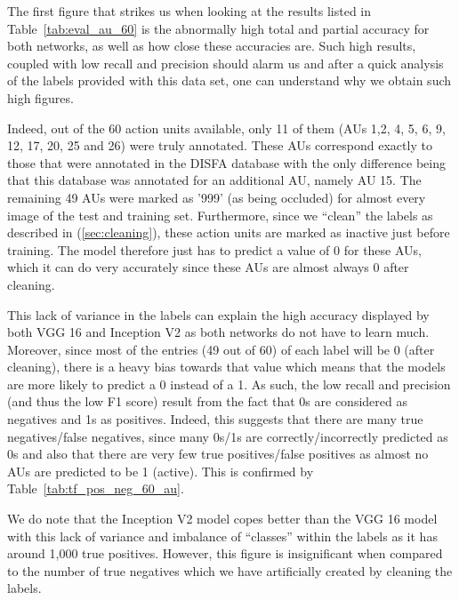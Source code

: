 \documentclass[12pt,twoside]{article}
\begin{document}
The first figure that strikes us when looking at the results listed in
Table~\ref{tab:eval_au_60} is the abnormally high total and partial accuracy
for both networks, as well as how close these accuracies are. Such high
results, coupled with low recall and precision should alarm us and after a
quick analysis of the labels provided with this data set, one can understand
why we obtain such high figures. 

Indeed, out of the 60 action units available, only 11 of them (AUs 1,2, 4, 5,
6, 9, 12, 17, 20, 25 and 26) were truly annotated. These AUs correspond exactly
to those that were annotated in the DISFA \cite{RefWorks:17} database with the only
difference being that this database was annotated for an additional AU, namely
AU 15. The remaining 49 AUs were marked as '999' (as being occluded) for almost
every image of the test and training set. Furthermore, since we ``clean'' the
labels as described in (\ref{sec:cleaning}), these action units are marked as
inactive just before training. The model therefore just has to predict a value
of 0 for these AUs, which it can do very accurately since these AUs are almost
always 0 after cleaning.

This lack of variance in the labels can explain the high accuracy displayed by
both VGG 16 and Inception V2 as both networks do not have to learn much.
Moreover, since most of the entries (49 out of 60) of each label will be 0
(after cleaning), there is a heavy bias towards that value which means that the
models are more likely to predict a 0 instead of a 1. As such, the low recall
and precision (and thus the low F1 score) result from the fact that 0s are
considered as negatives and 1s as positives. Indeed, this suggests that there
are many true negatives/false negatives, since many 0s/1s are
correctly/incorrectly predicted as 0s and also that
there are very few true positives/false positives as almost no AUs are predicted to be 1
(active). This is confirmed by Table~\ref{tab:tf_pos_neg_60_au}.

We do note that the Inception V2 model copes better than the VGG 16 model  with this lack of variance
and imbalance of ``classes'' within the labels as it has around 1,000 true
positives. However, this figure is insignificant when compared to the number of
true negatives which we have artificially created by cleaning the labels.
\end{document}
